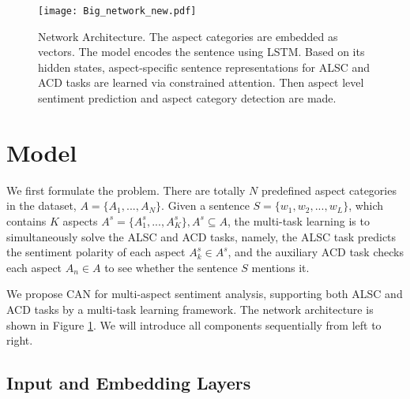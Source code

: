\begin{figure*}
\setlength{\abovecaptionskip}{0.2cm}   %
\setlength{\belowcaptionskip}{-0.3cm}   %
\centering
	\texttt{[image: Big\_network\_new.pdf]}
    \caption{Network Architecture. The aspect categories are embedded as vectors. The model encodes the sentence using LSTM. Based on its hidden states, aspect-specific sentence representations for ALSC and ACD tasks are learned via constrained attention. Then aspect level sentiment prediction and aspect category detection are made. }
    \label{network}
\end{figure*}
\section{Model}
We first formulate the problem. There are totally $N$ predefined aspect categories in the dataset, $A=\{A_1,...,A_N\}$. Given a sentence $S=\{w_1, w_2, ..., w_L\}$, which contains $K$ aspects $A^s=\{A_1^s,...,A_K^s\}, A^s\subseteq  A$, the multi-task learning is to simultaneously solve the ALSC and ACD tasks, namely, the ALSC task predicts the sentiment polarity of each aspect $A_k^s \in A^s$, and the auxiliary ACD task checks each aspect $A_n \in A$ to see whether the sentence $S$ mentions it.

We propose CAN for multi-aspect sentiment analysis, supporting both ALSC and ACD tasks by a multi-task learning framework. The network architecture is shown in Figure \ref{network}. We will introduce all components sequentially from left to right.

\subsection{Input and Embedding Layers}
